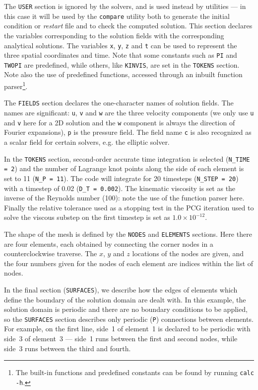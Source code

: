 \documentclass[11pt,a4paper]{report}
\begin{document}
The \texttt{USER} section is ignored by the solvers, and is used
instead by utilities --- in this case it will be used by the
\texttt{compare} utility both to generate the initial condition or
\textsl{restart} file and to check the computed solution.  This
section declares the variables corresponding to the solution fields
with the corresponding analytical solutions.  The variables
\texttt{x}, \texttt{y}, \texttt{z} and \texttt{t} can be used to
represent the three spatial coordinates and time.  Note that some
constants such as \texttt{PI} and \texttt{TWOPI} are predefined, while
others, like \texttt{KINVIS}, are set in the \texttt{TOKENS} section.
Note also the use of predefined functions, accessed through an inbuilt
function parser\footnote{The built-in functions and predefined constants
can be found by running \texttt{calc -h}.}.

The \texttt{FIELDS} section declares the one-character names of
solution fields.  The names are significant: \texttt{u}, \texttt{v}
and \texttt{w} are the three velocity components (we only use
\texttt{u} and \texttt{v} here for a 2D solution and the \texttt{w}
component is always the direction of Fourier expansions), \texttt{p}
is the pressure field.  The field name \texttt{c} is also recognized
as a scalar field for certain solvers, e.g. the elliptic solver.

In the \texttt{TOKENS} section, second-order accurate time integration
is selected (\verb+N_TIME = 2+) and the number of Lagrange knot points
along the side of each element is set to 11 (\verb+N_P = 11+).  The
code will integrate for 20 timesteps (\verb+N_STEP = 20+) with a
timestep of 0.02 (\verb+D_T = 0.002+).  The kinematic viscosity is
set as the inverse of the Reynolds number (100): note the use of the
function parser here.  Finally the relative tolerance used as a
stopping test in the PCG iteration used to solve the viscous substep
on the first timestep is set as $1.0\times10^{-12}$.

The shape of the mesh is defined by the \texttt{NODES} and
\texttt{ELEMENTS} sections.  Here there are four elements, each
obtained by connecting the corner nodes in a counterclockwise
traverse.  The $x$, $y$ and $z$ locations of the nodes are given, and
the four numbers given for the nodes of each element are indices
within the list of nodes.

In the final section (\texttt{SURFACES}), we describe how the edges of
elements which define the boundary of the solution domain are dealt
with.  In this example, the solution domain is periodic and there are
no boundary conditions to be applied, so the \texttt{SURFACES} section
describes only periodic (\verb+P+) connections between elements.  For
example, on the first line, side~1 of element~1 is declared to be
periodic with side~3 of element~3 --- side~1 runs between the first
and second nodes, while side~3 runs between the third and fourth.
\end{document}
